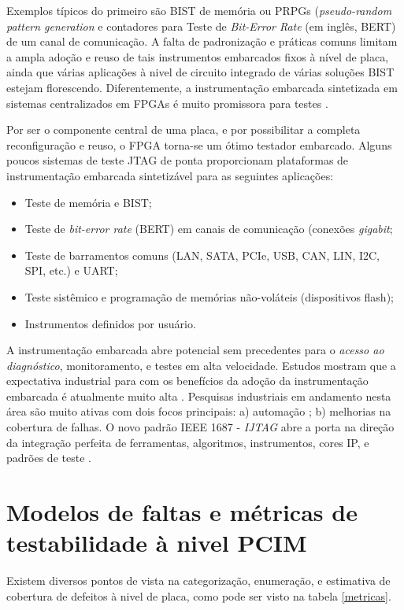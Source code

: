Exemplos típicos do primeiro são BIST de memória ou PRPGs (\textit{pseudo-random pattern generation} e contadores para Teste de \textit{Bit-Error Rate} (em inglês, BERT) de um canal de comunicação. A falta de padronização e práticas comuns limitam a ampla adoção e reuso de tais instrumentos embarcados fixos à nível de placa, ainda que várias aplicações à nivel de circuito integrado de várias soluções BIST estejam florescendo. Diferentemente, a instrumentação embarcada sintetizada em sistemas centralizados em FPGAs é muito promissora para testes \citep{6401571}.\par
Por ser o componente central de uma placa, e por possibilitar a completa reconfiguração e reuso, o FPGA torna-se um ótimo testador embarcado. Alguns poucos sistemas de teste JTAG de ponta proporcionam plataformas de instrumentação embarcada sintetizável para as seguintes aplicações:
\begin{itemize}
\item Teste de memória e BIST;
\item Teste de \textit{bit-error rate} (BERT) em canais de comunicação (conexões \textit{gigabit};
\item Teste de barramentos comuns (LAN, SATA, PCIe, USB, CAN, LIN, I2C, SPI, etc.) e UART;
\item Teste sistêmico e programação de memórias não-voláteis (dispositivos flash);
\item Instrumentos definidos por usuário.
\end{itemize}

A instrumentação embarcada abre potencial sem precedentes para o \textit{acesso ao diagnóstico}, monitoramento, e testes em alta velocidade. Estudos mostram que a expectativa industrial para com os benefícios da adoção da instrumentação embarcada é atualmente muito alta \citep{frostsullivan2010}. Pesquisas industriais em andamento nesta área são muito ativas com dois focos principais: a) automação \citep{aleksejev2013fpga}; b) melhorias na cobertura de falhas. O novo padrão IEEE 1687 - \textit{IJTAG} abre a porta na direção da integração perfeita de ferramentas, algoritmos, instrumentos, cores IP, e padrões de teste \citep{crouch2007ijtag}.

\section{Modelos de faltas e métricas de testabilidade à nivel PCIM}
Existem diversos pontos de vista na categorização, enumeração, e estimativa de cobertura de defeitos à nivel de placa, como pode ser visto na tabela \ref{metricas}.

